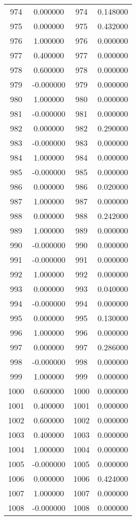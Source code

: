 \documentclass[12pt]{article}
\begin{document}
\begin{longtable}{@{}cccc@{}}
974 & 0.000000 & 974 & 0.148000 \\
975 & 0.000000 & 975 & 0.432000 \\
976 & 1.000000 & 976 & 0.000000 \\
977 & 0.400000 & 977 & 0.000000 \\
978 & 0.600000 & 978 & 0.000000 \\
979 & -0.000000 & 979 & 0.000000 \\
980 & 1.000000 & 980 & 0.000000 \\
981 & -0.000000 & 981 & 0.000000 \\
982 & 0.000000 & 982 & 0.290000 \\
983 & -0.000000 & 983 & 0.000000 \\
984 & 1.000000 & 984 & 0.000000 \\
985 & -0.000000 & 985 & 0.000000 \\
986 & 0.000000 & 986 & 0.020000 \\
987 & 1.000000 & 987 & 0.000000 \\
988 & 0.000000 & 988 & 0.242000 \\
989 & 1.000000 & 989 & 0.000000 \\
990 & -0.000000 & 990 & 0.000000 \\
991 & -0.000000 & 991 & 0.000000 \\
992 & 1.000000 & 992 & 0.000000 \\
993 & 0.000000 & 993 & 0.040000 \\
994 & -0.000000 & 994 & 0.000000 \\
995 & 0.000000 & 995 & 0.130000 \\
996 & 1.000000 & 996 & 0.000000 \\
997 & 0.000000 & 997 & 0.286000 \\
998 & -0.000000 & 998 & 0.000000 \\
999 & 1.000000 & 999 & 0.000000 \\
1000 & 0.600000 & 1000 & 0.000000 \\
1001 & 0.400000 & 1001 & 0.000000 \\
1002 & 0.600000 & 1002 & 0.000000 \\
1003 & 0.400000 & 1003 & 0.000000 \\
1004 & 1.000000 & 1004 & 0.000000 \\
1005 & -0.000000 & 1005 & 0.000000 \\
1006 & 0.000000 & 1006 & 0.424000 \\
1007 & 1.000000 & 1007 & 0.000000 \\
1008 & -0.000000 & 1008 & 0.000000 \\

\end{longtable}
\end{document}
